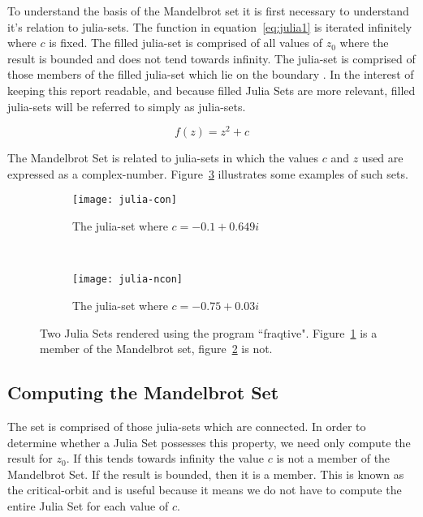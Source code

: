 To understand the basis of the Mandelbrot set it is first necessary to understand it's relation to julia-sets.
The function in equation~\ref{eq:julia1} is iterated infinitely where \(c\) is fixed.
The filled julia-set is comprised of all values of \(z_0\) where the result is bounded and does not tend towards infinity.
The julia-set is comprised of those members of the filled julia-set which lie on the boundary \cite{chaosfract}.
In the interest of keeping this report readable, and because filled Julia Sets are more relevant, filled julia-sets will be 
referred to simply as julia-sets.

\begin{equation}\label{eq:julia1}
f(z) = z^2 + c
\end{equation}

The Mandelbrot Set is related to julia-sets in which the values \(c\) and \(z\) used are expressed as a 
\gls{complex-number}. Figure~\ref{fig:juliaimgs} illustrates some examples of such sets. 

\begin{figure}[h]
\centering
\begin{subfigure}[b]{0.48\textwidth}
  \centering    
  \texttt{[image: julia-con]}
  \caption{
    \tiny The julia-set where \(c = -0.1 + 0.649i\)
  }
  \label{fig:juliaimgcon}
\end{subfigure}
~ %
\begin{subfigure}[b]{0.48\textwidth}
  \centering
  \texttt{[image: julia-ncon]}
  \caption{
    \tiny The julia-set where \(c = -0.75 + 0.03i\)
  }
  \label{fig:juliaimgncon}
\end{subfigure}
\caption{
  Two Julia Sets rendered using the program ``fraqtive"\cite{fraqtive}. 
  Figure~\ref{fig:juliaimgcon} is a member of the Mandelbrot set, 
  figure~\ref{fig:juliaimgncon} is not.
}
\label{fig:juliaimgs}
\end{figure}

\subsection*{Computing the Mandelbrot Set}

The set is comprised of those julia-sets which are connected. In order to determine whether a Julia Set possesses this property,
we need only compute the result for \(z_0\). If this tends towards infinity the value \(c\) is not a member of the Mandelbrot Set. If the result
is bounded, then it is a member. This is known as the \gls{critical-orbit} and is useful because it means we do not have to compute
the entire Julia Set for each value of \(c\).

